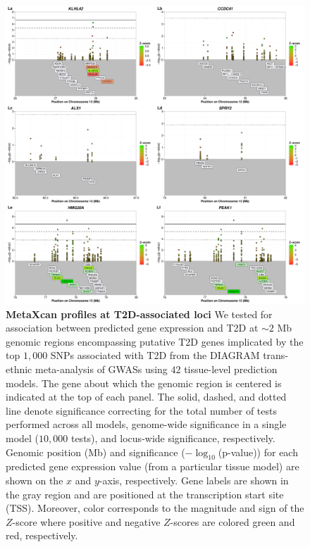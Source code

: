 \documentclass[10pt]{article}
\begin{document}
\begin{figure}
\ContinuedFloat
\includegraphics[width=\textwidth]{sup_fig1_part12_locusArray.pdf}
	\caption{\textbf{MetaXcan profiles at T2D-associated loci} We tested for association between predicted gene expression and T2D at $\sim2$ Mb genomic regions encompassing putative T2D genes implicated by the top $1,000$ SNPs associated with T2D from the DIAGRAM trans-ethnic meta-analysis of GWASs using $42$ tissue-level prediction models. The gene about which the genomic region is centered is indicated at the top of each panel. The solid, dashed, and dotted line denote significance correcting for the total number of tests performed across all models, genome-wide significance in a single model ($10,000$ tests), and locus-wide significance, respectively. Genomic position (Mb) and significance ($-\log_{10}$(p-value)) for each predicted gene expression value (from a particular tissue model) are shown on the $x$ and $y$-axis, respectively. Gene labels are shown in the gray region and are positioned at the transcription start site (TSS). Moreover, color corresponds to the magnitude and sign of the $Z$-score where positive and negative $Z$-scores are colored green and red, respectively.} 
    \label{fig:supp.locus_array_fig1_part12}
\end{figure}
\end{document}
